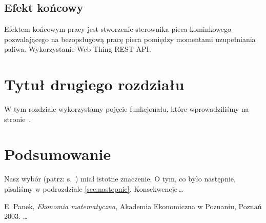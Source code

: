 \documentclass[11pt,a4paper]{report}
\begin{document}
  
 
 \section{Efekt końcowy}
 Efektem końcowym pracy jest stworzenie sterownika pieca kominkowego pozwalającego na bezopsługową pracę pieca pomiędzy momentami uzupełniania paliwa.
 Wykorzystanie Web Thing REST API.
 


 \chapter{Tytuł drugiego rozdziału}
 W tym rozdziale wykorzystamy pojęcie funkcjonału, które
 wprowadziliśmy na stronie~\pageref{poj:funkcjonal}.

 \chapter*{Podsumowanie}

 Nasz wybór (patrz: s.~\pageref{sec:wybor}) miał istotne znaczenie.
 O tym, co było następnie, pisaliśmy w podrozdziale \ref{sec:nastepnie}.
 Konsekwencje\,\ldots

 \begin{thebibliography}{9}
 E. Panek, \emph{Ekonomia matematyczna}, Akademia Ekonomiczna w Poznaniu,
 Poznań 2003.
 \ldots
 \end{thebibliography}

 
\end{document}
